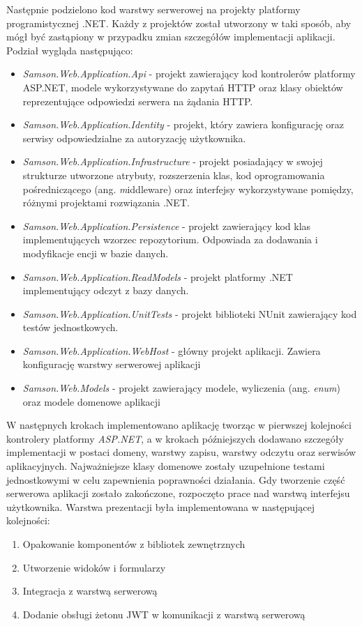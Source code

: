 \documentclass[a4paper,twoside,12pt]{book}
\newcommand{\obcy}[1]{\emph{#1}}
\newcommand{\ang}[1]{{\selectlanguage{british}\obcy{#1}}}
\begin{document}
	Następnie podzielono kod warstwy serwerowej na projekty platformy programistycznej .NET. Każdy z projektów został utworzony w taki sposób, aby mógł być zastąpiony w przypadku zmian szczegółów implementacji aplikacji. Podział wygląda następująco:
	\begin{itemize}
		\item \textit{Samson.Web.Application.Api} - projekt zawierający kod kontrolerów platformy ASP.NET, modele wykorzystywane do zapytań HTTP oraz klasy obiektów reprezentujące odpowiedzi serwera na żądania HTTP.
		\item \textit{Samson.Web.Application.Identity} - projekt, który zawiera konfigurację oraz serwisy odpowiedzialne za autoryzację użytkownika.
		\item \textit{Samson.Web.Application.Infrastructure} - projekt posiadający w swojej strukturze utworzone atrybuty, rozszerzenia klas, kod oprogramowania pośredniczącego (ang. \ang middleware) oraz interfejsy wykorzystywane pomiędzy, różnymi projektami rozwiązania .NET.
		\item \textit{Samson.Web.Application.Persistence} - projekt zawierający kod klas implementujących wzorzec repozytorium. Odpowiada za dodawania i modyfikacje encji w bazie danych.
		\item \textit{Samson.Web.Application.ReadModels} - projekt platformy .NET implementujący odczyt z bazy danych.
		\item \textit{Samson.Web.Application.UnitTests} - projekt biblioteki NUnit zawierający kod testów jednostkowych.
		\item \textit{Samson.Web.Application.WebHost} - główny projekt aplikacji. Zawiera konfigurację warstwy serwerowej aplikacji
		\item \textit{Samson.Web.Models} - projekt zawierający modele, wyliczenia (ang. \ang{enum}) oraz modele domenowe aplikacji
	\end{itemize}
	
	W następnych krokach implementowano aplikację tworząc w pierwszej kolejności kontrolery platformy \textit{ASP.NET}, a w krokach późniejszych dodawano szczegóły implementacji w postaci domeny, warstwy zapisu, warstwy odczytu oraz serwisów aplikacyjnych. Najważniejsze klasy domenowe zostały uzupełnione testami jednostkowymi w celu zapewnienia poprawności działania. Gdy tworzenie część serwerowa aplikacji zostało zakończone, rozpoczęto prace nad warstwą interfejsu użytkownika. Warstwa prezentacji była implementowana w następującej kolejności:
	\begin{enumerate}
		\item Opakowanie komponentów z bibliotek zewnętrznych
		\item Utworzenie widoków i formularzy
		\item Integracja z warstwą serwerową
		\item Dodanie obsługi żetonu JWT w komunikacji z warstwą serwerową
	\end{enumerate}
\end{document}
